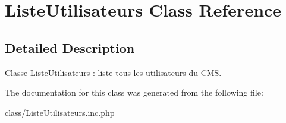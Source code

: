 \hypertarget{class_liste_utilisateurs}{
\section{ListeUtilisateurs Class Reference}
\label{class_liste_utilisateurs}
}


\subsection{Detailed Description}
Classe \hyperlink{class_liste_utilisateurs}{ListeUtilisateurs} : liste tous les utilisateurs du CMS. 

The documentation for this class was generated from the following file:\begin{DoxyCompactItemize}
\item 
class/ListeUtilisateurs.inc.php\end{DoxyCompactItemize}
